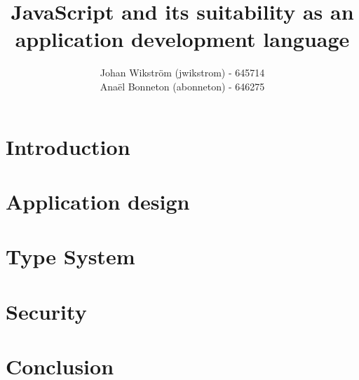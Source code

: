 \documentclass{report}
\title{JavaScript and its suitability as an application development language}
\author{Johan Wikström (jwikstrom) - 645714\\
Anaël Bonneton (abonneton) - 646275 
}
\begin{document}
\maketitle
\tableofcontents

\section{Introduction}


\section{Application design}



\section{Type System}

\section{Security}

\section{Conclusion}
\end{document}
